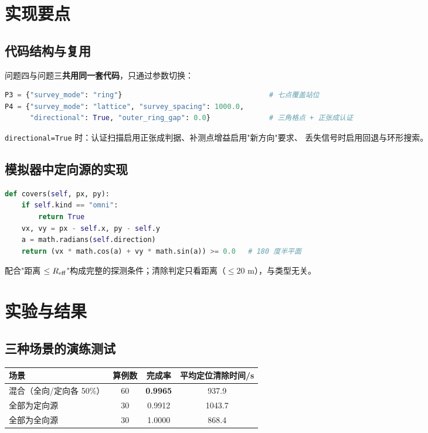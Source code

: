 \section{实现要点}

\subsection{代码结构与复用}

问题四与问题三\textbf{共用同一套代码}，只通过参数切换：
\begin{lstlisting}[language=Python,caption={问题三/四的参数差异}]
P3 = {"survey_mode": "ring"}                                   # 七点覆盖站位
P4 = {"survey_mode": "lattice", "survey_spacing": 1000.0,
      "directional": True, "outer_ring_gap": 0.0}              # 三角格点 + 正张成认证
\end{lstlisting}

\texttt{directional=True} 时：认证扫描启用正张成判据、补测点增益启用"新方向"要求、
丢失信号时启用回退与环形搜索。

\subsection{模拟器中定向源的实现}

\begin{lstlisting}[language=Python,caption={定向源的覆盖判定（simulator.Source.covers）}]
def covers(self, px, py):
    if self.kind == "omni":
        return True
    vx, vy = px - self.x, py - self.y
    a = math.radians(self.direction)
    return (vx * math.cos(a) + vy * math.sin(a)) >= 0.0   # 180 度半平面
\end{lstlisting}

配合"距离 $\le R_{\rm eff}$"构成完整的探测条件；清除判定只看距离（$\le20$ m），与类型无关。

\section{实验与结果}

\subsection{三种场景的演练测试}

\begin{center}
\begin{tabular}{lccc}
\toprule
场景 & 算例数 & 完成率 & 平均定位清除时间/s \\ \midrule
混合（全向/定向各 50\%） & 60 & \textbf{0.9965} & 937.9 \\
全部为定向源 & 30 & 0.9912 & 1043.7 \\
全部为全向源 & 30 & 1.0000 & 868.4 \\
\bottomrule
\end{tabular}
\end{center}

